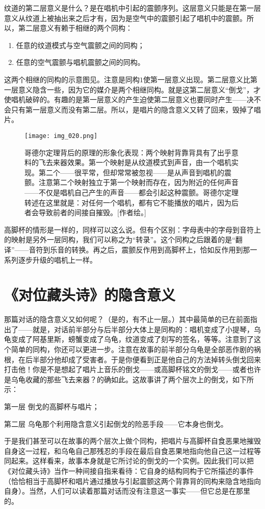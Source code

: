 纹道的第二层意义是什么？是在唱机中引起的震颤序列。这层意义只能是在第一层意义从纹道上被抽出来之后才有，因为是空气中的震颤引起了唱机中的震颤。所以，第二层意义有赖于相继的两个同构：
\begin{enumerate}
\item 任意的纹道模式与空气震颤之间的同构；
\item 任意的空气震颤与唱机震颤之间的同构。
\end{enumerate}
这两个相继的同构的示意图见。注意是同构$1$使第一层意义出现。第二层意义比第一层意义隐含一些，因为它的媒介是两个相继同构。就是这第二层意义“倒戈”，才使唱机破碎的。有趣的是第一层意义的产生迫使第二层意义也要同时产生——决不会只有第一层意义而没有第二层。所以，是唱片的隐含意义又转了回来，毁掉了唱片。

\begin{figure}
\texttt{[image: img\_020.png]}
\caption[哥德尔定理背后的原理的形象化表现。]
  {哥德尔定理背后的原理的形象化表现：两个映射背靠背具有了出乎意料的飞去来器效果。第一个映射是从纹道模式到声音，由一个唱机实现。第二个——很平常，但却常常被忽视——是从声音到唱机的震颤。注意第二个映射独立于第一个映射而存在，因为附近的任何声音——不仅是唱机自己产生的声音——都会引起这种震颤。哥德尔定理转述在这里就是：对任何一个唱机，都有它不能播放的唱片，因为后者会导致前者的间接自摧毁。[作者绘。] }
\end{figure}

高脚杯的情形是一样的，同样可以这么说。但有个区别：字母表中的字母到音符上的映射是另外一层同构，我们可以称之为“转录”。这个同构之后跟着的是“翻译”——音符到乐音的转换。再之后，震颤反作用到高脚杯上，恰如反作用到那一系列逐步升级的唱机上一样。

\section{《对位藏头诗》的隐含意义}

那篇对话的隐含意义又如何呢？（是的，有不止一层。）其中最简单的已在前面指出了——就是，对话前半部分与后半部分大体上是同构的：唱机变成了小提琴，乌龟变成了阿基里斯，螃蟹变成了乌龟，纹道变成了刻写的签名，等等。注意到了这个简单的同构，你还可以更进一步。注意在故事的前半部分乌龟是全部恶作剧的祸根，在后半部分他却成了受害者。于是你便看到正是他自己的方法掉转头倒戈回来打击他！你是不是想起了唱片上音乐的倒戈——或高脚杯铭文的倒戈——或者也许是乌龟收藏的那些飞去来器？的确如此。这故事讲了两个层次上的倒戈，如下所示：
\begin{thm}{第一层}
倒戈的高脚杯与唱片；
\end{thm}
\begin{thm}{第二层}
乌龟那个利用隐含意义引起倒戈的险恶手段——它本身也倒戈。
\end{thm}
于是我们甚至可以在故事的两个层次上做个同构，把唱片与高脚杯自食恶果地摧毁自身这一过程，和乌龟自己那残忍的手段在最后自食恶果地指向他自己这一过程等同起来。这样看来，故事本身就是它所讨论的倒戈的一个实例。因此我们可以把《对位藏头诗》当作一种间接自指来看待：它自身的结构同构于它所描述的事件（恰恰相当于高脚杯和唱片通过播放与引起震颤这两个背靠背的同构来隐含地指向自身）。当然，人们可以读着那篇对话而没有注意这一事实——但它总是在那里的。

